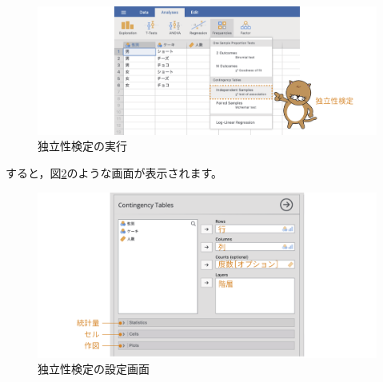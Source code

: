 \documentclass[
  12pt,
  a5jpaper,
  lualatex, ja=standard]{bxjsbook}
\begin{document}
\begin{figure}[!ht]

{\centering \includegraphics[width=1\linewidth]{images/frequencies/chisq-menu} 

}

\caption{独立性検定の実行}\label{fig:frequencies-chisq-menu}
\end{figure}

すると，図\ref{fig:frequencies-chisq-setting}のような画面が表示されます。

\begin{figure}[!ht]

{\centering \includegraphics[width=1\linewidth]{images/frequencies/chisq-setting} 

}

\caption{独立性検定の設定画面}\label{fig:frequencies-chisq-setting}
\end{figure}
\end{document}
